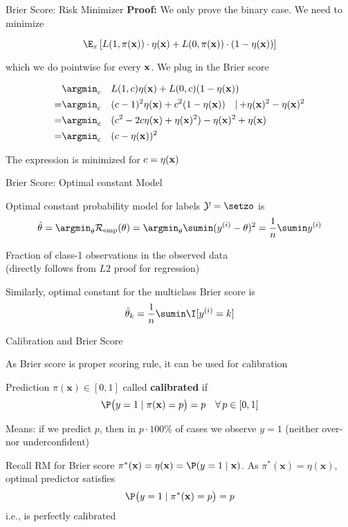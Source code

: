 \documentclass[11pt,compress,t,notes=noshow, xcolor=table]{beamer}
\begin{document}
\begin{frame}{Brier Score: Risk Minimizer}
\textbf{Proof: } We only prove the binary case. We need to minimize 

$$
\E_x \left[L(1, \pix) \cdot \eta(\xv) + L(0, \pix) \cdot (1 - \eta(\xv)) \right]
$$

which we do pointwise for every $\mathbf{x}$. We plug in the Brier score

\vspace*{-0.3cm}

\begin{align*}
& \argmin_c \quad L(1, c) \eta(\xv) + L(0, c) (1 - \eta(\xv)) \\ 
=&  \argmin_c \quad (c - 1)^2 \eta(\xv) + c^2 (1 - \eta(\xv))  \quad |{\,+\eta(\xv)^2-\eta(\xv)^2}\\
=&  \argmin_c \quad (c^2 -2c\eta(\xv) + \eta(\xv)^2)- \eta(\xv)^2 + \eta(\xv) \\
=&  \argmin_c \quad (c - \eta(\xv))^2
\end{align*}

The expression is minimized for $c = \eta(\mathbf{x})$

\end{frame}

\begin{framei}[sep=L]{Brier Score: Optimal constant Model}

\item Optimal constant probability model for labels $\Yspace = \setzo$ is 
$$\thetah=\argmin_{\theta} \riske(\theta) = \argmin_{\theta} \sumin (\yi - \theta)^2 = \frac{1}{n} \sumin \yi$$
\item Fraction of class-1 observations in the observed data\\ (directly follows from $L2$ proof for regression)
\item Similarly, optimal constant for the multiclass Brier score is $$\thetah_k = \frac{1}{n}\sumin \I [\yi = k]$$

\end{framei}

\begin{framei}[sep=L]{Calibration and Brier Score}

\item As Brier score is proper scoring rule, it can be used for calibration
\item Prediction $\pi(\mathbf{x})\in[0,1]$ called \textbf{calibrated} if 
$$\P\bigl(y=1 \mid \pi(\mathbf{x})=p\bigr)=p \quad \forall\, p\in[0,1]$$
\item Means: if we predict $p$, then in $p \cdot 100\%$ of cases we observe $y=1$ (neither over- nor underconfident)
\item Recall RM for Brier score $\pi^*(\mathbf{x}) = \eta(\mathbf{x}) = \P(y=1 \mid \mathbf{x})$. As \(\pi^*(\mathbf{x})=\eta(\mathbf{x})\), optimal predictor satisfies $$\P\bigl(y=1 \mid \pi^*(\mathbf{x})=p\bigr)=p$$
i.e., is perfectly calibrated

\end{framei}
\end{document}
